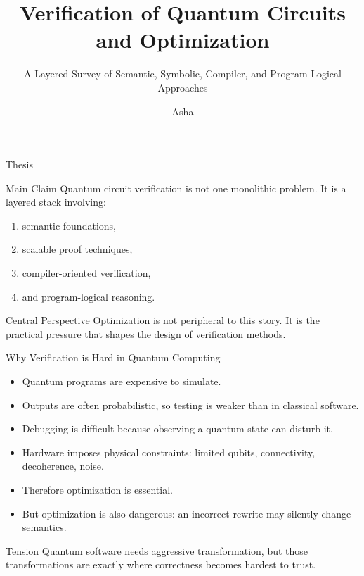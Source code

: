 \documentclass[aspectratio=169]{beamer}
\title{Verification of Quantum Circuits and Optimization}
\subtitle{A Layered Survey of Semantic, Symbolic, Compiler, and Program-Logical Approaches}
\author{Asha}
\institute{}
\date{}
\begin{document}
\begin{frame}
  \titlepage
\end{frame}

\begin{frame}{Thesis}
\justifying
\begin{block}{Main Claim}
Quantum circuit verification is not one monolithic problem. It is a layered stack involving:
\begin{enumerate}
    \item semantic foundations,
    \item scalable proof techniques,
    \item compiler-oriented verification,
    \item and program-logical reasoning.
\end{enumerate}
\end{block}

\pause

\begin{alertblock}{Central Perspective}
Optimization is not peripheral to this story. It is the practical pressure that shapes the design of verification methods.
\end{alertblock}
\end{frame}

\begin{frame}{Why Verification is Hard in Quantum Computing}
\justifying
\begin{itemize}
    \item Quantum programs are expensive to simulate.
    \item Outputs are often probabilistic, so testing is weaker than in classical software.
    \item Debugging is difficult because observing a quantum state can disturb it.
    \item Hardware imposes physical constraints: limited qubits, connectivity, decoherence, noise.
    \item Therefore optimization is essential.
    \item But optimization is also dangerous: an incorrect rewrite may silently change semantics.
\end{itemize}

\vspace{0.5em}
\begin{block}{Tension}
Quantum software needs aggressive transformation, but those transformations are exactly where correctness becomes hardest to trust.
\end{block}
\end{frame}
\end{document}
